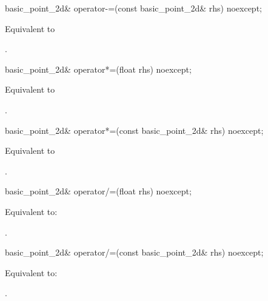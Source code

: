 %
\begin{itemdecl}
basic_point_2d& operator-=(const basic_point_2d& rhs) noexcept;
\end{itemdecl}
\begin{itemdescr}
\pnum \effects Equivalent to 

\pnum \returns {}.
\end{itemdescr}

%
\begin{itemdecl}
basic_point_2d& operator*=(float rhs) noexcept;
\end{itemdecl}
\begin{itemdescr}
\pnum
\effects
Equivalent to 

\pnum
\returns
{}.
\end{itemdescr}

%
\begin{itemdecl}
basic_point_2d& operator*=(const basic_point_2d& rhs) noexcept;
\end{itemdecl}
\begin{itemdescr}
\pnum
\effects
Equivalent to 

\pnum
\returns
{}.
\end{itemdescr}

%
\begin{itemdecl}
basic_point_2d& operator/=(float rhs) noexcept;
\end{itemdecl}
\begin{itemdescr}
\pnum
\effects
Equivalent to: 

\pnum
\returns
{}.
\end{itemdescr}

%
\begin{itemdecl}
basic_point_2d& operator/=(const basic_point_2d& rhs) noexcept;
\end{itemdecl}
\begin{itemdescr}
\pnum
\effects
Equivalent to: 

\pnum
\returns
{}.
\end{itemdescr}

